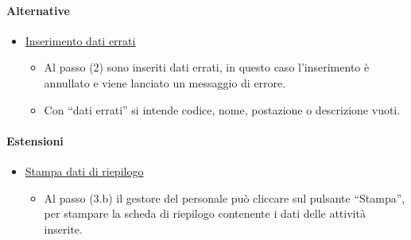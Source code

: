 \paragraph{Alternative}
\begin{itemize}
	\item \underline{Inserimento dati errati}
		\begin{itemize}
			\item Al passo (2) sono inseriti dati errati, in questo caso l'inserimento è annullato e viene lanciato un messaggio di errore. 
			\item Con “dati errati” si intende codice, nome, postazione o descrizione vuoti.
		\end{itemize}
\end{itemize}
\paragraph{Estensioni}
\begin{itemize}
	\item \underline{Stampa dati di riepilogo}
		\begin{itemize}
			\item Al passo (3.b) il gestore del personale può cliccare sul pulsante “Stampa”, per stampare la scheda di riepilogo contenente i dati delle attività inserite. 
		\end{itemize}
\end{itemize}